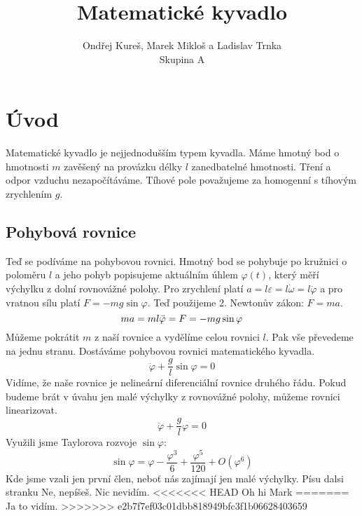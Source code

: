 \documentclass{article}
\title{{\Huge Matematické kyvadlo}}
\author{Ondřej Kureš, Marek Mikloš a Ladislav Trnka\\
Skupina A}
\date{}
\begin{document}
\maketitle
\section{Úvod}
Matematické kyvadlo je nejjednodušším typem kyvadla. Máme hmotný bod o hmotnosti $m$ zavěšený na provázku délky $l$ zanedbatelné hmotnosti. Tření a odpor vzduchu nezapočítáváme. Tíhové pole považujeme za homogenní s tíhovým zrychlením $g$.
\subsection*{Pohybová rovnice}
Teď se podíváme na pohybovou rovnici. Hmotný bod se pohybuje po kružnici o poloměru $l$ a jeho pohyb popisujeme aktuálním úhlem $\varphi(t)$, který měří výchylku z dolní rovnovážné polohy. Pro zrychlení platí $a=l\varepsilon=l\dot{\omega}=l\ddot{\varphi}$ a pro vratnou sílu platí $F=-mg\sin\varphi$. Teď použijeme 2. Newtonův zákon: $F=ma$.
\begin{equation*}
ma=ml\ddot{\varphi}=F=-mg\sin\varphi\\
\end{equation*}
Můžeme pokrátit $m$ z naší rovnice a vydělíme celou rovnici $l$. Pak vše převedeme na jednu stranu. Dostáváme pohybovou rovnici matematického kyvadla.
\begin{equation}
\boxed{\ddot{\varphi}+\frac{g}{l}\sin\varphi=0}
\end{equation}
Vidíme, že naše rovnice je nelineární diferenciální rovnice druhého řádu. Pokud budeme brát v úvahu jen malé výchylky z rovnovážné polohy, můžeme rovnici linearizovat.
\begin{equation}
\ddot{\varphi}+\frac{g}{l}\varphi=0
\end{equation}
Využili jsme Taylorova rozvoje $\sin\varphi$:
\begin{equation*}
\sin\varphi = \varphi-\frac{\varphi^3}{6}+\frac{\varphi^5}{120}+O\left(\varphi^6\right)
\end{equation*}
Kde jsme vzali jen první člen, neboť nás zajímají jen malé výchylky.
\newpage
Písu dalsi stranku
Ne, nepíšeš. Nic nevidím.
<<<<<<< HEAD
Oh hi Mark
=======
Ja to vidím.
>>>>>>> e2b7f7ef03c01dbb818949bfc3f1b06628403659
\end{document}
